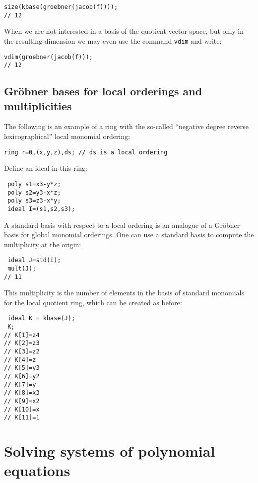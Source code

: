 \documentclass[12pt]{amsart}
\begin{document}
\begin{verbatim}
size(kbase(groebner(jacob(f))));
// 12
\end{verbatim}

When we are not interested in a basis of the quotient vector space, but only in the resulting dimension we may 
even use the command \texttt{vdim} and write:

\begin{verbatim}
vdim(groebner(jacob(f)));
// 12
\end{verbatim}


\subsection{Gr\"obner bases for local orderings and multiplicities}

The following is an example of a ring with the so-called ``negative degree reverse lexicographical'' local monomial ordering:

\begin{verbatim}
ring r=0,(x,y,z),ds; // ds is a local ordering
\end{verbatim}


Define an ideal in this ring:

\begin{verbatim}
 poly s1=x3-y*z;
 poly s2=y3-x*z;
 poly s3=z3-x*y;
 ideal I=(s1,s2,s3);
\end{verbatim}

A standard basis with respect to a local ordering is an analogue of a Gr\"obner basis for global monomial orderings.
One can use a standard basis to compute the multiplicity at the origin:

\begin{verbatim}
 ideal J=std(I);
 mult(J);
// 11 
\end{verbatim}

This multiplicity is the number of elements in the basis of standard monomials for the local quotient ring,
 which can be created as before:

\begin{verbatim}
 ideal K = kbase(J);
 K; 
// K[1]=z4
// K[2]=z3
// K[3]=z2
// K[4]=z
// K[5]=y3
// K[6]=y2
// K[7]=y
// K[8]=x3
// K[9]=x2
// K[10]=x
// K[11]=1
\end{verbatim}
 

\section{Solving systems of polynomial equations}
\end{document}
